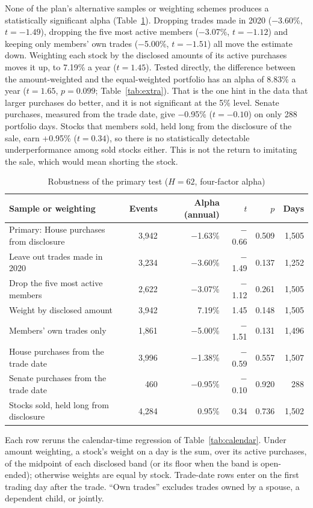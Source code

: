 \documentclass[11pt]{article}
\newcommand{\m}{\ensuremath{-}}
\begin{document}
None of the plan's alternative samples or weighting schemes produces a statistically significant alpha (Table~\ref{tab:robust}). Dropping trades made in 2020 (\m3.60\%, $t = \m1.49$), dropping the five most active members (\m3.07\%, $t = \m1.12$) and keeping only members' own trades (\m5.00\%, $t = \m1.51$) all move the estimate down. Weighting each stock by the disclosed amounts of its active purchases moves it up, to 7.19\% a year ($t = 1.45$). Tested directly, the difference between the amount-weighted and the equal-weighted portfolio has an alpha of 8.83\% a year ($t = 1.65$, $p = 0.099$; Table~\ref{tab:extra}). That is the one hint in the data that larger purchases do better, and it is not significant at the 5\% level. Senate purchases, measured from the trade date, give \m0.95\% ($t = \m0.10$) on only 288 portfolio days. Stocks that members sold, held long from the disclosure of the sale, earn +0.95\% ($t = 0.34$), so there is no statistically detectable underperformance among sold stocks either. This is not the return to imitating the sale, which would mean shorting the stock.

\begin{table}[H]
\centering
\caption{Robustness of the primary test ($H = 62$, four-factor alpha)}\label{tab:robust}
\begin{tabular}{lrrrrr}
\toprule
Sample or weighting & Events & Alpha (annual) & $t$ & $p$ & Days \\
\midrule
Primary: House purchases from disclosure & 3,942 & \m1.63\% & \m0.66 & 0.509 & 1,505 \\
Leave out trades made in 2020 & 3,234 & \m3.60\% & \m1.49 & 0.137 & 1,252 \\
Drop the five most active members & 2,622 & \m3.07\% & \m1.12 & 0.261 & 1,505 \\
Weight by disclosed amount & 3,942 & 7.19\% & 1.45 & 0.148 & 1,505 \\
Members' own trades only & 1,861 & \m5.00\% & \m1.51 & 0.131 & 1,496 \\
House purchases from the trade date & 3,996 & \m1.38\% & \m0.59 & 0.557 & 1,507 \\
Senate purchases from the trade date & 460 & \m0.95\% & \m0.10 & 0.920 & 288 \\
Stocks sold, held long from disclosure & 4,284 & 0.95\% & 0.34 & 0.736 & 1,502 \\
\bottomrule
\end{tabular}

\smallskip
\parbox{0.9\linewidth}{\footnotesize Each row reruns the calendar-time regression of Table~\ref{tab:calendar}. Under amount weighting, a stock's weight on a day is the sum, over its active purchases, of the midpoint of each disclosed band (or its floor when the band is open-ended); otherwise weights are equal by stock. Trade-date rows enter on the first trading day after the trade. ``Own trades'' excludes trades owned by a spouse, a dependent child, or jointly.}
\end{table}
\end{document}
